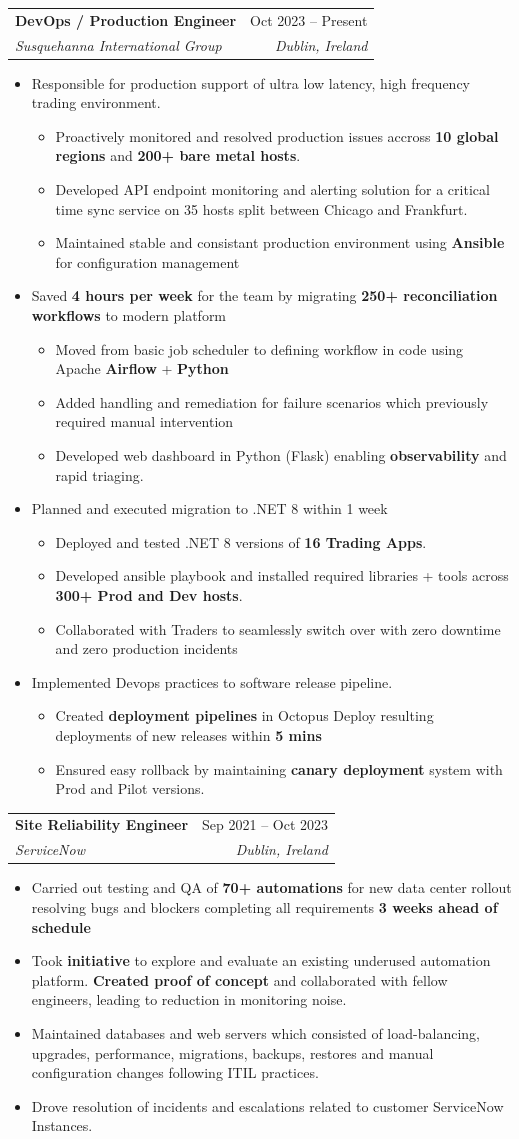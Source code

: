 \documentclass[letterpaper,11pt]{article}
\makeatletter
\newcommand{\resumeItem}[1]{
  \item\small{
    {#1\vspace{0.5pt}}
  }
}
\newcommand{\resumeSubheading}[4]{
  \vspace{-5pt}\item
    \begin{tabular*}{0.97\textwidth}[t]{l@{\extracolsep{\fill}}r}
      \textbf{#1} & #2 \\
      \textit{\small#3} & \textit{\small #4} \\
    \end{tabular*}\vspace{-6pt}
}
\newcommand{\resumeItemListStart}{\begin{itemize}}
\newcommand{\resumeItemListEnd}{\end{itemize}}
\makeatother
\begin{document}
    \resumeSubheading
      {DevOps / Production Engineer}{Oct 2023 -- Present}
      {Susquehanna International Group}{Dublin, Ireland}
      \resumeItemListStart
        \resumeItem{Responsible for production support of ultra low latency, high frequency trading environment.}
        \resumeItemListStart
          \resumeItem{Proactively monitored and resolved production issues accross \textbf{10 global regions} and \textbf{200+ bare metal hosts}.}
          \resumeItem{Developed  API endpoint monitoring and alerting solution for a critical time sync service on 35 hosts split between Chicago and Frankfurt.}
          \resumeItem{Maintained stable and consistant production environment using \textbf{Ansible} for configuration management }
        \resumeItemListEnd
        \resumeItem{Saved \textbf{4 hours per week} for the team by migrating \textbf{250+ reconciliation workflows} to modern platform}
        \resumeItemListStart
          \resumeItem{Moved from basic job scheduler to defining workflow in code using Apache \textbf{Airflow} + \textbf{Python} }
          \resumeItem{Added handling and remediation for failure scenarios which previously required manual intervention}
          \resumeItem{Developed web dashboard in Python (Flask) enabling \textbf{observability} and rapid triaging.}
        \resumeItemListEnd
        \resumeItem{Planned and executed migration to .NET 8 within 1 week}
        \resumeItemListStart
          \resumeItem{Deployed and tested .NET 8 versions of \textbf{16 Trading Apps}.}
          \resumeItem{Developed ansible playbook and installed required libraries + tools across \textbf{300+ Prod and Dev hosts}.}
          \resumeItem{Collaborated with Traders to seamlessly switch over with zero downtime and zero production incidents}
        \resumeItemListEnd
        \resumeItem{Implemented Devops practices to software release pipeline.}
        \resumeItemListStart
          \resumeItem{Created \textbf{deployment pipelines} in Octopus Deploy resulting deployments of new releases within \textbf{5 mins} }
          \resumeItem{Ensured easy rollback by maintaining \textbf{canary deployment} system with Prod and Pilot versions.}
        \resumeItemListEnd
      \resumeItemListEnd

    \resumeSubheading
      {Site Reliability Engineer}{Sep 2021 -- Oct 2023}
      {ServiceNow}{Dublin, Ireland}
      \resumeItemListStart
        \resumeItem{Carried out testing and QA of \textbf{70+ automations} for new data center rollout resolving bugs and blockers completing all requirements \textbf{3 weeks ahead of schedule}}
        \resumeItem{Took \textbf{initiative} to explore and evaluate an existing underused automation platform. \textbf{Created proof of concept} and collaborated with fellow engineers, leading to reduction in monitoring noise.}
        \resumeItem{Maintained databases and web servers which consisted of load-balancing, upgrades, performance, migrations, backups, restores and manual configuration changes following ITIL practices.}
        \resumeItem{Drove resolution of incidents and escalations related to customer ServiceNow Instances.}
    \resumeItemListEnd
\end{document}

